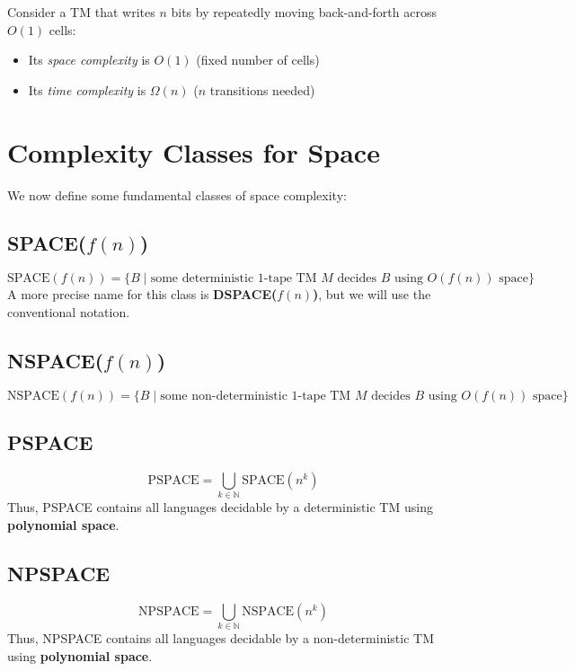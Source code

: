 \begin{example}
Consider a TM that writes $n$ bits by repeatedly moving back-and-forth across $O(1)$ cells:
\begin{itemize}
    \item Its \textit{space complexity} is $O(1)$ (fixed number of cells)
    \item Its \textit{time complexity} is $\Omega(n)$ ($n$ transitions needed)
\end{itemize}
\end{example}



\section{Complexity Classes for Space}

We now define some fundamental classes of space complexity:

\subsection{SPACE(\( f(n) \))}
\[
\text{SPACE}(f(n)) = \{ B \mid \text{some deterministic 1-tape TM } M \text{ decides } B \text{ using } O(f(n)) \text{ space} \}
\]
A more precise name for this class is \textbf{DSPACE(\( f(n) \))}, but we will use the conventional notation.

\subsection{NSPACE(\( f(n) \))}
\[
\text{NSPACE}(f(n)) = \{ B \mid \text{some non-deterministic 1-tape TM } M \text{ decides } B \text{ using } O(f(n)) \text{ space} \}
\]

\subsection{PSPACE}
\[
\text{PSPACE} = \bigcup_{k \in \mathbb{N}} \text{SPACE}(n^k)
\]
Thus, PSPACE contains all languages decidable by a deterministic TM using \textbf{polynomial space}.

\subsection{NPSPACE}
\[
\text{NPSPACE} = \bigcup_{k \in \mathbb{N}} \text{NSPACE}(n^k)
\]
Thus, NPSPACE contains all languages decidable by a non-deterministic TM using \textbf{polynomial space}.

